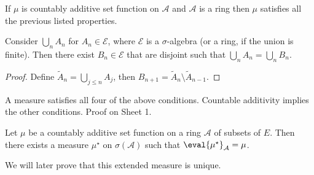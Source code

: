 \begin{remark}
	If $\mu$ is countably additive set function on $\mathcal{A}$ and $\mathcal{A}$ is a ring then $\mu$ satisfies all the previous listed properties.
\end{remark}

\begin{proposition}
	Consider $\bigcup_n A_n$ for $A_n \in \mathcal E$, where $\mathcal E$ is a $\sigma$-algebra (or a ring, if the union is finite).
	Then there exist $B_n \in \mathcal E$ that are disjoint such that $\bigcup_n A_n = \bigcup_n B_n$.
\end{proposition}

\begin{proof}
	Define $\widetilde A_n = \bigcup_{j \leq n} A_j$, then $B_{n+1} = \widetilde A_n \setminus \widetilde A_{n-1}$.
\end{proof}

\begin{remark} \label{rem:1}
	A measure satisfies all four of the above conditions. Countable additivity implies the other conditions. Proof on Sheet 1.
\end{remark}

\begin{theorem} \label{thm:car}
	Let $\mu$ be a countably additive set function on a ring $\mathcal A$ of subsets of $E$.
	Then there exists a measure $\mu^\star$ on $\sigma(\mathcal A)$ such that $\eval{\mu^\star}_{\mathcal A} = \mu$.
\end{theorem}

We will later prove that this extended measure is unique.

